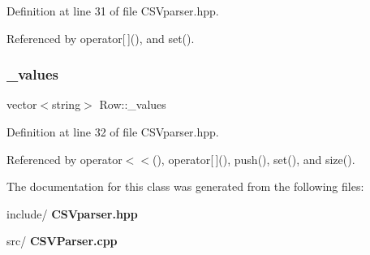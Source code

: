 Definition at line 31 of file C\+S\+Vparser.\+hpp.



Referenced by operator[$\,$](), and set().

\mbox{\label{class_row_ab064db33f941055c8d99a6f47eae733c}} 
\subsubsection{\+\_\+values}
{\footnotesize\ttfamily vector$<$string$>$ Row\+::\+\_\+values\hspace{0.3cm}{\ttfamily [private]}}



Definition at line 32 of file C\+S\+Vparser.\+hpp.



Referenced by operator$<$$<$(), operator[$\,$](), push(), set(), and size().



The documentation for this class was generated from the following files\+:\begin{DoxyCompactItemize}
\item 
include/\textbf{ C\+S\+Vparser.\+hpp}\item 
src/\textbf{ C\+S\+V\+Parser.\+cpp}\end{DoxyCompactItemize}
